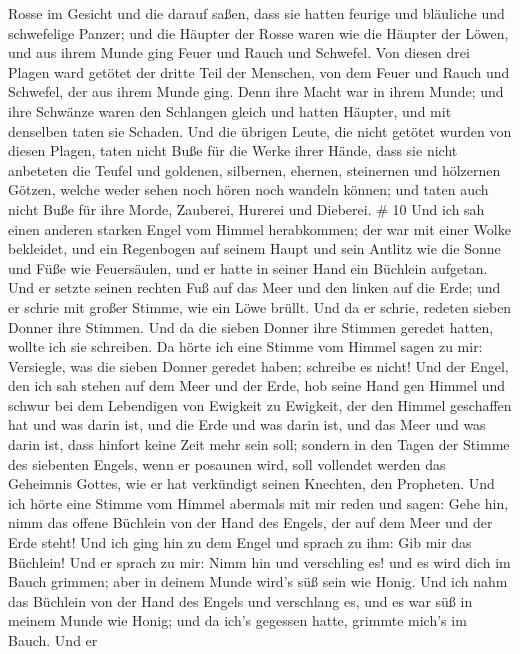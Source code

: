 Rosse im Gesicht und die darauf saßen, dass sie hatten feurige und
bläuliche und schwefelige Panzer; und die Häupter der Rosse waren wie
die Häupter der Löwen, und aus ihrem Munde ging Feuer und Rauch und
Schwefel.  Von diesen drei Plagen ward getötet der dritte
Teil der Menschen, von dem Feuer und Rauch und Schwefel, der aus ihrem
Munde ging.  Denn ihre Macht war in ihrem Munde; und ihre
Schwänze waren den Schlangen gleich und hatten Häupter, und mit
denselben taten sie Schaden.  Und die übrigen Leute, die
nicht getötet wurden von diesen Plagen, taten nicht Buße für die Werke
ihrer Hände, dass sie nicht anbeteten die Teufel und goldenen,
silbernen, ehernen, steinernen und hölzernen Götzen, welche weder sehen
noch hören noch wandeln können;  und taten auch nicht Buße
für ihre Morde, Zauberei, Hurerei und Dieberei. \# 10  Und
ich sah einen anderen starken Engel vom Himmel herabkommen; der war mit
einer Wolke bekleidet, und ein Regenbogen auf seinem Haupt und sein
Antlitz wie die Sonne und Füße wie Feuersäulen,  und er
hatte in seiner Hand ein Büchlein aufgetan. Und er setzte seinen rechten
Fuß auf das Meer und den linken auf die Erde;  und er schrie
mit großer Stimme, wie ein Löwe brüllt. Und da er schrie, redeten sieben
Donner ihre Stimmen.  Und da die sieben Donner ihre Stimmen
geredet hatten, wollte ich sie schreiben. Da hörte ich eine Stimme vom
Himmel sagen zu mir: Versiegle, was die sieben Donner geredet haben;
schreibe es nicht!  Und der Engel, den ich sah stehen auf
dem Meer und der Erde, hob seine Hand gen Himmel  und schwur
bei dem Lebendigen von Ewigkeit zu Ewigkeit, der den Himmel geschaffen
hat und was darin ist, und die Erde und was darin ist, und das Meer und
was darin ist, dass hinfort keine Zeit mehr sein soll; 
sondern in den Tagen der Stimme des siebenten Engels, wenn er posaunen
wird, soll vollendet werden das Geheimnis Gottes, wie er hat verkündigt
seinen Knechten, den Propheten.  Und ich hörte eine Stimme
vom Himmel abermals mit mir reden und sagen: Gehe hin, nimm das offene
Büchlein von der Hand des Engels, der auf dem Meer und der Erde steht!
 Und ich ging hin zu dem Engel und sprach zu ihm: Gib mir
das Büchlein! Und er sprach zu mir: Nimm hin und verschling es! und es
wird dich im Bauch grimmen; aber in deinem Munde wird's süß sein wie
Honig.  Und ich nahm das Büchlein von der Hand des Engels
und verschlang es, und es war süß in meinem Munde wie Honig; und da
ich's gegessen hatte, grimmte mich's im Bauch.  Und er
